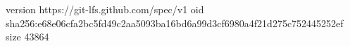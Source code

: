 version https://git-lfs.github.com/spec/v1
oid sha256:e68e06cfa2bc5fd49c2aa5093ba16bd6a99d3cf6980a4f21d275c752445252ef
size 43864

